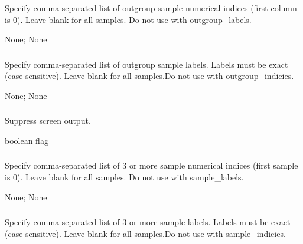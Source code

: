 \documentclass[letterpaper,11pt,english]{sphinxmanual}
\begin{document}
\subsubsection{}
\label{\detokenize{prog_desc:outgroup-indices-outgroupindices}}
 Specify comma-separated list of outgroup sample numerical indices (first column is 0). Leave blank for all samples. Do not use with \textendash{}outgroup\_labels.

 None;  None


\subsubsection{}
\label{\detokenize{prog_desc:outgroup-labels-outgrouplabels}}
 Specify comma-separated list of outgroup sample labels. Labels must be exact (case-sensitive). Leave blank for all samples.Do not use with \textendash{}outgroup\_indicies.

 None;  None


\subsubsection{}
\label{\detokenize{prog_desc:id55}}
 Suppress screen output.

 boolean flag


\subsubsection{}
\label{\detokenize{prog_desc:id56}}
 Specify comma-separated list of 3 or more sample numerical indices (first sample is 0). Leave blank for all samples. Do not use with \textendash{}sample\_labels.

 None;  None


\subsubsection{}
\label{\detokenize{prog_desc:id57}}
 Specify comma-separated list of 3 or more sample labels. Labels must be exact (case-sensitive). Leave blank for all samples.Do not use with \textendash{}sample\_indicies.
\end{document}
